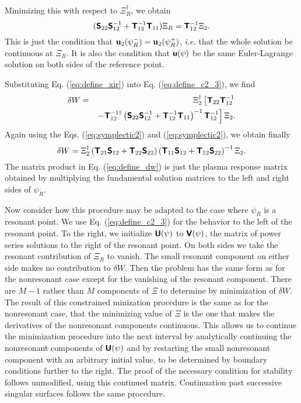 \documentclass[prb,twocolumn,showpacs,preprintnumbers,amsmath,amssymb]{revtex4}
\renewcommand*{\v}[1]{\hbox{\bfseries #1}}
\renewcommand*{\t}[1]{\hbox{\sffamily\bfseries #1}}
\begin{document}
Minimizing this with respect to $\Xi_R^\dagger$, we obtain
\begin{equation}
( \t{S}_{22} \t{S}_{12}^{-1}
	+ \t{T}_{12}^{-1} \t{T}_{11} ) \Xi_R
	= \t{T}_{12}^{-1} \Xi_2.
\label{eq:define_xir}
\end{equation}
This is just the condition that $\v{u}_2(\psi_R^-) = \v{u}_2(\psi_R^+)$,
{\it i.e.} that the whole solution be continuous at $\Xi_R$.  It is also
the condition that $\t{u}(\psi)$ be the same Euler-Lagrange solution on
both sides of the reference point.

Substituting Eq. (\ref{eq:define_xir}) into Eq. (\ref{eq:define_c2_3}),
we find
\begin{eqnarray}
\delta W =&& \Xi_2^\dagger \left[
	\t{T}_{22} \t{T}_{12}^{-1}  \right. \nonumber \\
&&\left. 
	- \t{T}_{12}^{-1\dagger}
	\left( \t{S}_{22} \t{S}_{12}^{-1}
	+ \t{T}_{12}^{-1} \t{T}_{11} \right)^{-1}
	\t{T}_{12}^{-1} \right] \Xi_2.
\end{eqnarray}
Again using the Eqs. (\ref{eq:symplectic2}) and (\ref{eq:symplectic2}),
we obtain finally
\begin{equation}
\delta W = \Xi_2^\dagger 
	\left( \t{T}_{21} \t{S}_{12} + \t{T}_{22} \t{S}_{22} \right)
	\left( \t{T}_{11} \t{S}_{12} + \t{T}_{12} \t{S}_{22} \right)^{-1}
	\Xi_2.
\label{eq:define_dw}
\end{equation}
The matrix product in Eq. (\ref{eq:define_dw}) is just the
plasma response matrix obtained by multiplying the fundamental solution
matrices to the left and right sides of $\psi_R$.

Now consider how this procedure may be adapted to the case where
$\psi_R$ is a resonant point.  We use Eq. (\ref{eq:define_c2_3}) for the
behavior to the left of the resonant point.  To the right, we initialize
$\t{U}(\psi)$ to $\t{V}(\psi)$, the matrix of power series solutions to
the right of the resonant point.  On both sides we take the resonant
contribution of $\Xi_R$ to vanish.  The small resonant component on
either side makes no contribution to $\delta W$.  Then the problem has
the same form as for the nonresonant case except for the vanishing of
the resonant component.  There are $M-1$ rather than $M$ components of
$\Xi$ to determine by minimization of $\delta W$.  The result of this
constrained minization procedure is the same as for the nonresonant
case, that the minimizing value of $\Xi$ is the one that makes the
derivatives of the nonresonant components continuous.  This allows us to
continue the minimization procedure into the next interval by
analytically continuing the nonresonant components of $\t{U}(\psi)$ and
by restarting the small nonresonant component with an arbitrary initial
value, to be determined by boundary conditions further to the right.
The proof of the necessary condition for stability follows unmodified,
using this continued matrix.  Continuation past successive singular
surfaces follows the same procedure.
\end{document}
